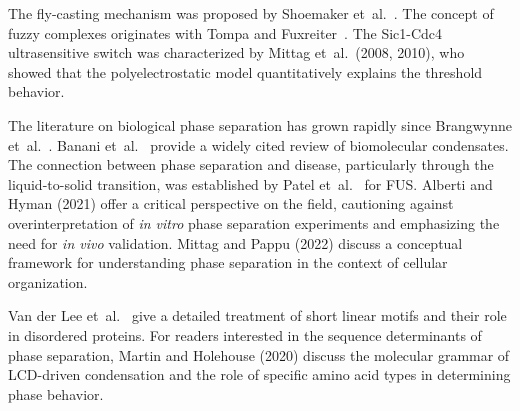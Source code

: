 The fly-casting mechanism was proposed by Shoemaker et~al.~\cite{shoemaker2000}.  The
concept of fuzzy complexes originates with Tompa and Fuxreiter~\cite{tompa2005}.  The
Sic1-Cdc4 ultrasensitive switch was characterized by Mittag et~al.\ (2008, 2010), who showed
that the polyelectrostatic model quantitatively explains the threshold behavior.

The literature on biological phase separation has grown rapidly since Brangwynne
et~al.~\cite{brangwynne2009}.  Banani et~al.~\cite{banani2017} provide a widely cited
review of biomolecular condensates.  The connection between phase separation and disease,
particularly through the liquid-to-solid transition, was established by Patel
et~al.~\cite{patel2015} for FUS.  Alberti and Hyman (2021) offer a critical perspective on
the field, cautioning against overinterpretation of \textit{in vitro} phase separation
experiments and emphasizing the need for \textit{in vivo} validation.  Mittag and Pappu
(2022) discuss a conceptual framework for understanding phase separation in the context of
cellular organization.

Van der Lee et~al.~\cite{vanderlee2014} give a detailed treatment of short linear motifs and
their role in disordered proteins.  For readers interested in the sequence determinants of
phase separation, Martin and Holehouse (2020) discuss the molecular grammar of LCD-driven
condensation and the role of specific amino acid types in determining phase behavior.
